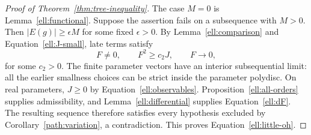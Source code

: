 \begin{proof}[Proof of Theorem~\ref{thm:tree-inequality}]
The case $M=0$ is Lemma~\ref{ell:functional}.  Suppose the
assertion fails on a subsequence with $M>0$.  Then
$|E(g)|\ge\epsilon M$ for some fixed $\epsilon>0$.
By Lemma~\ref{ell:comparison} and
Equation~\eqref{ell:J-small}, late terms satisfy
\[
 F\ne0,\qquad F^2\ge c_2J,\qquad F\longrightarrow0,
\]
for some $c_2>0$.  The finite parameter vectors have an
interior subsequential limit: all the earlier smallness
choices can be strict inside the parameter polydisc.
On real parameters, $J\ge0$ by Equation~\eqref{ell:observables}.
Proposition~\ref{ell:all-orders} supplies admissibility, and
Lemma~\ref{ell:differential} supplies Equation~\eqref{ell:dF}.
The resulting sequence therefore satisfies every hypothesis
excluded by Corollary~\ref{path:variation}, a contradiction.
This proves Equation~\eqref{ell:little-oh}.
\end{proof}
